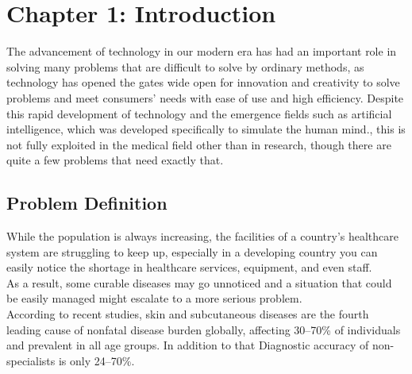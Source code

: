 \chapter{Chapter 1: Introduction}
The advancement of technology in our modern era has had an important role in solving many problems that are difficult to solve by ordinary methods, as technology has opened the gates wide open for innovation and creativity to solve problems and meet consumers’ needs with ease of use and high efficiency. Despite this rapid development of technology and the emergence fields such as artificial intelligence, which was developed specifically to simulate the human mind., this is not fully exploited in the medical field other than in research, though there are quite a few problems that need exactly that.
\section{Problem Definition }
While the population is always increasing, the facilities of a country's healthcare system are struggling to keep up, especially in a developing country you can easily notice the shortage in healthcare services, equipment, and even staff.\\
As a result, some curable diseases may go unnoticed and a situation that could be easily managed might escalate to a more serious problem. \\
According to recent studies, skin and subcutaneous diseases are the fourth leading cause of nonfatal disease burden globally, affecting 30–70\% of individuals and prevalent in all age groups. In addition to that Diagnostic accuracy of non-specialists is only 24–70\%.

